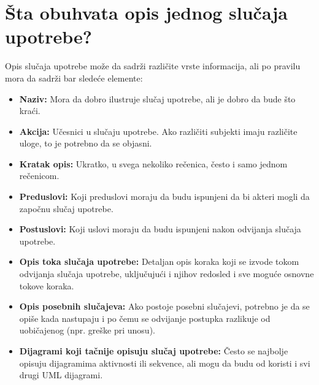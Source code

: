 \documentclass[a4paper]{article}
\begin{document}
\section{Šta obuhvata opis jednog slučaja upotrebe?}

  Opis slučaja upotrebe može da sadrži različite vrste informacija, ali po pravilu mora da sadrži bar sledeće elemente:
\begin{itemize}
    \item \textbf{Naziv:} Mora da dobro ilustruje slučaj upotrebe, ali je dobro da bude što kraći.
    \item \textbf{Akcija:} Učesnici u slučaju upotrebe. Ako različiti subjekti imaju različite uloge, to je potrebno da se objasni.
    \item \textbf{Kratak opis:} Ukratko, u svega nekoliko rečenica, često i samo jednom rečenicom.
    \item \textbf{Preduslovi:} Koji preduslovi moraju da budu ispunjeni da bi akteri mogli da započnu slučaj upotrebe.
    \item \textbf{Postuslovi:} Koji uslovi moraju da budu ispunjeni nakon odvijanja slučaja upotrebe.
    \item \textbf{Opis toka slučaja upotrebe:} Detaljan opis koraka koji se izvode tokom odvijanja slučaja upotrebe, uključujući i njihov redosled i sve moguće osnovne tokove koraka.
    \item \textbf{Opis posebnih slučajeva:} Ako postoje posebni slučajevi, potrebno je da se opiše kada nastupaju i po čemu se odvijanje postupka razlikuje od uobičajenog (npr. greške pri unosu).
    \item \textbf{Dijagrami koji tačnije opisuju slučaj upotrebe:} Često se najbolje opisuju dijagramima aktivnosti ili sekvence, ali mogu da budu od koristi i svi drugi UML dijagrami.\\
\end{itemize}
\end{document}
